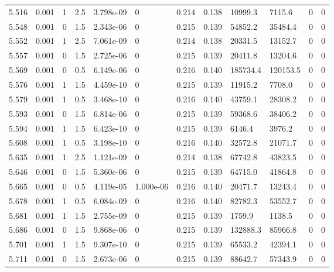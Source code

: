 \documentclass[preview]{standalone}
\begin{document}
{{{{{{{{{\begin{tabular}{L{1.2cm}C{1.2cm} C{0.3cm}C{0.5cm} C{1.4cm}C{1.4cm} C{1.4cm}C{1.4cm} C{1.6cm}C{1.6cm} C{1.6cm}C{1.6cm}}
  5.516  &  0.001  & 1     & 2.5 &  3.798e-09  & 0  &  0.214&   0.138& 10999.3 & 7115.6   &  0 & 0  \\ 
  5.548  &  0.001  & 0     & 1.5 &  2.343e-06  & 0  &  0.215&   0.139& 54852.2 & 35484.4   &  0 & 0  \\ 
  5.552  &  0.001  & 1     & 2.5 &  7.061e-09  & 0  &  0.214&   0.138& 20331.5 & 13152.7   &  0 & 0  \\ 
  5.557  &  0.001  & 0     & 1.5 &  2.725e-06  & 0  &  0.215&   0.139& 20411.8 & 13204.6   &  0 & 0  \\ 
  5.569  &  0.001  & 0     & 0.5 &  6.149e-06  & 0  &  0.216&   0.140& 185734.4 & 120153.5   &  0 & 0  \\ 
  5.576  &  0.001  & 1     & 1.5 &  4.459e-10  & 0  &  0.215&   0.139& 11915.2 & 7708.0   &  0 & 0  \\ 
  5.579  &  0.001  & 1     & 0.5 &  3.468e-10  & 0  &  0.216&   0.140& 43759.1 & 28308.2   &  0 & 0  \\ 
  5.593  &  0.001  & 0     & 1.5 &  6.814e-06  & 0  &  0.215&   0.139& 59368.6 & 38406.2   &  0 & 0  \\ 
  5.594  &  0.001  & 1     & 1.5 &  6.423e-10  & 0  &  0.215&   0.139& 6146.4 & 3976.2   &  0 & 0  \\ 
  5.608  &  0.001  & 1     & 0.5 &  3.198e-10  & 0  &  0.216&   0.140& 32572.8 & 21071.7   &  0 & 0  \\ 
  5.635  &  0.001  & 1     & 2.5 &  1.121e-09  & 0  &  0.214&   0.138& 67742.8 & 43823.5   &  0 & 0  \\ 
  5.646  &  0.001  & 0     & 1.5 &  5.360e-06  & 0  &  0.215&   0.139& 64715.0 & 41864.8   &  0 & 0  \\ 
  5.665  &  0.001  & 0     & 0.5 &  4.119e-05  & 1.000e-06  &  0.216&   0.140& 20471.7 & 13243.4   &  0 & 0  \\ 
  5.678  &  0.001  & 1     & 0.5 &  6.084e-09  & 0  &  0.216&   0.140& 82782.3 & 53552.7   &  0 & 0  \\ 
  5.681  &  0.001  & 1     & 1.5 &  2.755e-09  & 0  &  0.215&   0.139& 1759.9 & 1138.5   &  0 & 0  \\ 
  5.686  &  0.001  & 0     & 1.5 &  9.868e-06  & 0  &  0.215&   0.139& 132888.3 & 85966.8   &  0 & 0  \\ 
  5.701  &  0.001  & 1     & 1.5 &  9.307e-10  & 0  &  0.215&   0.139& 65533.2 & 42394.1   &  0 & 0  \\ 
  5.711  &  0.001  & 0     & 1.5 &  2.673e-06  & 0  &  0.215&   0.139& 88642.7 & 57343.9   &  0 & 0  \\ 

\end{tabular}}}}}}}}}}
\end{document}
